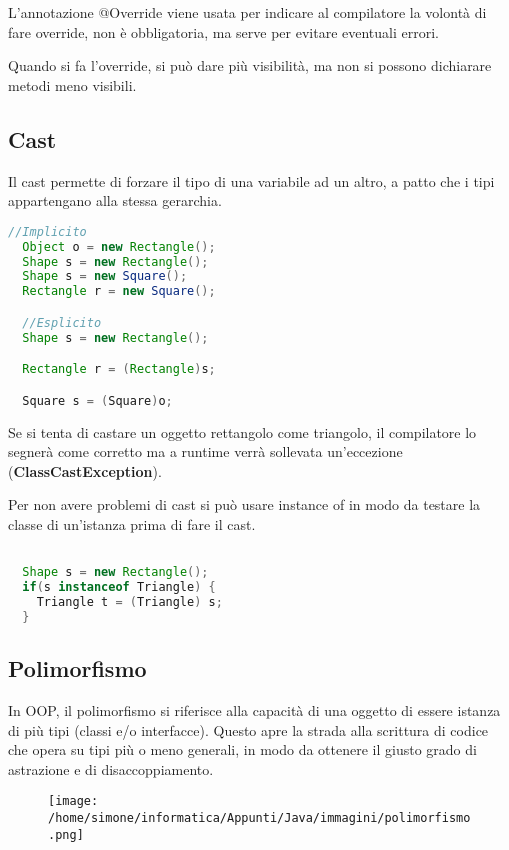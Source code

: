 \documentclass[a4paper,12pt,twoside]{book}
\begin{document}
L’annotazione @Override viene usata per indicare al compilatore la
volontà di fare override, non è obbligatoria, ma serve per evitare
eventuali errori.

Quando si fa l'override, si può dare più visibilità, ma non si possono
dichiarare metodi meno visibili.

\subsection{Cast}

Il cast permette di forzare il tipo di una variabile ad un altro, a
patto che i tipi appartengano alla stessa gerarchia.


\begin{lstlisting}[caption={},
  label={lst:Cast},language=Java]
  //Implicito
  Object o = new Rectangle();
  Shape s = new Rectangle();
  Shape s = new Square();
  Rectangle r = new Square();

  //Esplicito
  Shape s = new Rectangle();

  Rectangle r = (Rectangle)s;

  Square s = (Square)o;
\end{lstlisting}


Se si tenta di castare un oggetto rettangolo come triangolo, il
compilatore lo segnerà come corretto ma a runtime verrà sollevata
un'eccezione (\textbf{ClassCastException}).

Per non avere problemi di cast si può usare instance of in modo da
testare la classe di un'istanza prima di fare il cast.

\begin{lstlisting}[caption={},
  label={lst:InstanceOf},language=Java]

  Shape s = new Rectangle();
  if(s instanceof Triangle) {
    Triangle t = (Triangle) s;
  }

\end{lstlisting}

\subsection{Polimorfismo}

In OOP, il polimorfismo si riferisce alla capacità di una oggetto di
essere istanza di più tipi (classi e/o interfacce). Questo apre la
strada alla scrittura di codice che opera su tipi più o meno generali,
in modo da ottenere il giusto grado di astrazione e di
disaccoppiamento.

\begin{figure}
  \centering
  \texttt{[image: /home/simone/informatica/Appunti/Java/immagini/polimorfismo.png]}
\end{figure}
\end{document}
